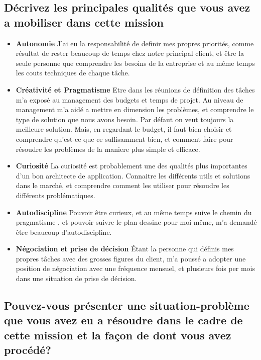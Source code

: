 \documentclass{resume} %
\begin{document}
	\subsection{Décrivez les principales qualités que vous avez a mobiliser dans cette mission}
	
		\begin{itemize} 				
			\item \textbf{Autonomie} \newline
				J'ai eu la responsabilité de definir mes propres priorités, comme résultat de rester beaucoup de temps chez notre principal client, et être la seule personne que comprendre les besoins de la entreprise et au même temps les couts techniques de chaque tâche.
			\item \textbf{Créativité et Pragmatisme } \newline
				Etre dans les réunions de définition des tâches m'a exposé au management des budgets et temps de projet. Au niveau de management m'a aidé a mettre en dimension les problèmes, et comprendre le type de solution que nous avons  besoin. Par défaut on veut toujours la meilleure solution. Mais, en regardant le budget, il faut bien choisir et comprendre qu'est-ce que ce suffisamment bien, et comment faire pour résoudre  les problèmes de la maniere plus simple et efficace. 
			\item \textbf{Curiosité } \newline
				La curiosité est probablement une des qualités plus importantes d'un bon architecte de application. Connaitre les différents utils et solutions dans le marché, et comprendre comment les utiliser pour résoudre les différents problématiques.
			\item \textbf{Autodiscipline} \newline
				Pouvoir être curieux, et au même temps suive le chemin du pragmatisme  , et pouvoir suivre le plan dessine pour moi même, m'a demandé être  beaucoup d'autodiscipline.
			\item \textbf{Négociation  et prise de décision } \newline
				Étant la personne qui définis mes propres tâches avec des grosses figures du client, m'a poussé a adopter une position de négociation avec une fréquence mensuel, et plusieurs fois per mois dans une situation de prise de décision.  
		\end{itemize}
		
	\subsection{Pouvez-vous présenter une situation-problème que vous avez eu a résoudre dans le cadre de cette mission et la façon de dont vous avez procédé?}
	
\end{document}
